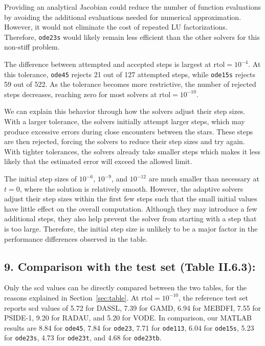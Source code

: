 \documentclass[11pt]{article}
\begin{document}
Providing an analytical Jacobian could reduce the number
of function evaluations by avoiding the additional evaluations
needed for numerical approximation. However, it would not
eliminate the cost of repeated LU factorizations. Therefore,
\texttt{ode23s} would likely remain less efficient than the
other solvers for this non-stiff problem.

The difference between attempted and accepted steps is largest at
$\mathrm{rtol}=10^{-4}$. At this tolerance, \texttt{ode45}
rejects 21 out of 127 attempted steps, while \texttt{ode15s}
rejects 59 out of 522. As the tolerance becomes more restrictive,
the number of rejected steps decreases, reaching zero for most
solvers at $\mathrm{rtol}=10^{-10}$.

We can explain this behavior through how the solvers adjust their step
sizes. With a larger tolerance, the solvers initially attempt
larger steps, which may produce excessive errors during close
encounters between the stars. These steps are then rejected,
forcing the solvers to reduce their step sizes and try again.
With tighter tolerances, the solvers already take smaller steps which makes
it less likely that the estimated error will exceed the
allowed limit.

The initial step sizes of $10^{-6}$, $10^{-9}$, and $10^{-12}$
are much smaller than necessary at $t=0$, where the solution
is relatively smooth. However, the adaptive solvers adjust
their step sizes within the first few steps such that the small
initial values have little effect on the overall computation.
Although they may introduce a few additional steps, they
also help prevent the solver from starting with a step that
is too large. Therefore, the initial step size is unlikely
to be a major factor in the performance differences
observed in the table.

\subsection{9. Comparison with the test set (Table II.6.3):}
Only the scd values can be directly compared between the two
tables, for the reasons explained in Section~\ref{sec:table}.
At $\mathrm{rtol}=10^{-10}$, the reference test set reports
scd values of 5.72 for DASSL, 7.39 for GAMD, 6.94 for
MEBDFI, 7.55 for PSIDE-1, 9.20 for RADAU, and 5.20
for VODE. In comparison, our MATLAB results are 8.84
for \texttt{ode45}, 7.84 for \texttt{ode23}, 7.71 for
\texttt{ode113}, 6.04 for \texttt{ode15s}, 5.23 for
\texttt{ode23s}, 4.73 for \texttt{ode23t}, and 4.68
for \texttt{ode23tb}.
\end{document}
